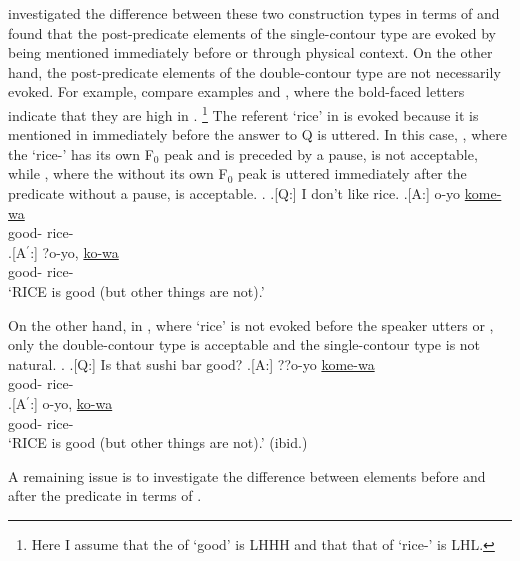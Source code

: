  investigated the difference between these two construction types in terms of  and found that
the post-predicate elements of the single-contour type are evoked
by being mentioned immediately before or through physical context.
On the other hand,
the post-predicate elements of the double-contour type are not necessarily evoked.
For example, compare examples \Next and \NNext,
where the bold-faced letters indicate that
they are high in .%
	\footnote{
	Here I assume that the  of  `good' is LHHH
	and that that of  `rice-' is LHL.
	}
The referent `rice' in \Next is evoked
because it is mentioned in \Next[Q] immediately before the answer to Q is uttered.
In this case,
\Next[A$^{\prime}$],
where the   `rice-' has its own F$_{0}$ peak and is preceded by a pause,
is not acceptable,
while \Next[A],
where the  without its own F$_{0}$ peak is uttered immediately after the predicate without a pause,
is acceptable.
%
\ex. 
 \a.[Q:] I don't like rice.
	\bg.[A:] o-yo \ul{kome-wa} \\
			good- rice- \\
	\bg.[A$^{\prime}$:] ?o-yo, \ul{ko-wa} \\
			good- rice- \\
			`RICE is good (but other things are not).'
			\hfill{\cite[][7]{nakagawaetal08_paper}}

On the other hand,
in \Next, where `rice' is not evoked before the speaker utters \Next[A] or \Next[A$^{\prime}$],
only the double-contour type \Next[A$^{\prime}$] is acceptable
and the single-contour type \Next[A] is not natural.
\ex. 
 \a.[Q:] Is that sushi bar good?
	\bg.[A:] ??o-yo \ul{kome-wa} \\
			good- rice- \\
	\bg.[A$^{\prime}$:] o-yo, \ul{ko-wa} \\
			good- rice- \\
			`RICE is good (but other things are not).'
			\hfill{(ibid.)}

A remaining issue is
to investigate the difference between elements before and after the predicate in terms of .


